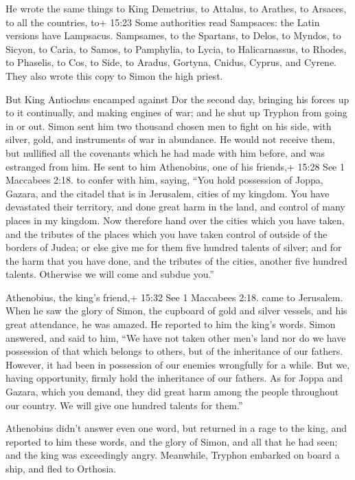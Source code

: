  He wrote the same things to King Demetrius, to Attalus, to
Arathes, to Arsaces,  to all the countries, to+ 15:23 Some
authorities read Sampsaces: the Latin versions have Lampsacus.
Sampsames, to the Spartans, to Delos, to Myndos, to Sicyon, to Caria, to
Samos, to Pamphylia, to Lycia, to Halicarnassus, to Rhodes, to Phaselis,
to Cos, to Side, to Aradus, Gortyna, Cnidus, Cyprus, and Cyrene.
 They also wrote this copy to Simon the high priest.

 But King Antiochus encamped against Dor the second day,
bringing his forces up to it continually, and making engines of war; and
he shut up Tryphon from going in or out.  Simon sent him
two thousand chosen men to fight on his side, with silver, gold, and
instruments of war in abundance.  He would not receive
them, but nullified all the covenants which he had made with him before,
and was estranged from him.  He sent to him Athenobius, one
of his friends,+ 15:28 See 1 Maccabees 2:18. to confer with him, saying,
``You hold possession of Joppa, Gazara, and the citadel that is in
Jerusalem, cities of my kingdom.  You have devastated their
territory, and done great harm in the land, and control of many places
in my kingdom.  Now therefore hand over the cities which
you have taken, and the tributes of the places which you have taken
control of outside of the borders of Judea;  or else give
me for them five hundred talents of silver; and for the harm that you
have done, and the tributes of the cities, another five hundred talents.
Otherwise we will come and subdue you.''

 Athenobius, the king's friend,+ 15:32 See 1 Maccabees
2:18. came to Jerusalem. When he saw the glory of Simon, the cupboard of
gold and silver vessels, and his great attendance, he was amazed. He
reported to him the king's words.  Simon answered, and said
to him, ``We have not taken other men's land nor do we have possession
of that which belongs to others, but of the inheritance of our fathers.
However, it had been in possession of our enemies wrongfully for a
while.  But we, having opportunity, firmly hold the
inheritance of our fathers.  As for Joppa and Gazara, which
you demand, they did great harm among the people throughout our country.
We will give one hundred talents for them.''

Athenobius didn't answer even one word,  but returned in a
rage to the king, and reported to him these words, and the glory of
Simon, and all that he had seen; and the king was exceedingly angry.
 Meanwhile, Tryphon embarked on board a ship, and fled to
Orthosia.

